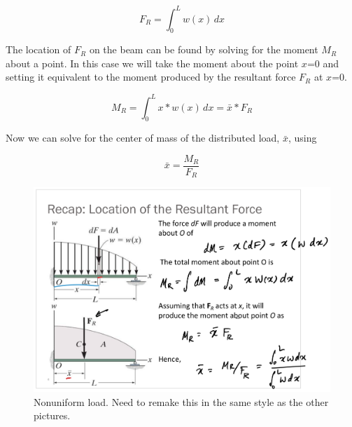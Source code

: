 \[F_R = \int_{0}^{L} w(x) \,dx \]

The location of $F_R$ on the beam can be found by solving for the moment $M_R$ about a point. In this case we will take the moment about the point $x$=0 and setting it equivalent to the moment produced by the resultant force $F_R$ at $x$=0. 

\[M_R = \int_{0}^{L} x*w(x) \,dx = \bar{x}*F_R\]

Now we can solve for the center of mass of the distributed load, $\bar{x}$, using

\[\bar{x} = \dfrac{M_R}{F_R}\]

\begin{figure}[!h]
\centering
\includegraphics[angle=0, width=5 in]{ForceSystemsFigures/NonuniformLoad.PNG}
\vspace{-2mm}
\caption{\small Nonuniform load. Need to remake this in the same style as the other pictures.}
\vspace{-3mm}
\label{Fig:NonUniLoad}
\end{figure}


